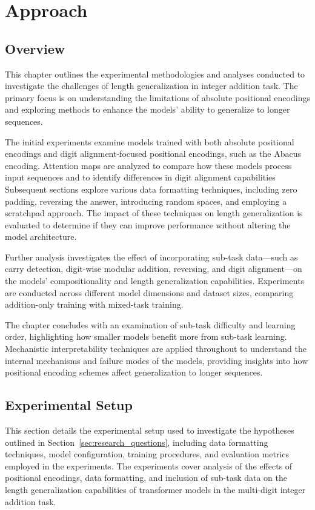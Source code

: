 \chapter{Approach}\label{approach}

\section{Overview}\label{sec:overview}

This chapter outlines the experimental methodologies and analyses conducted to investigate the challenges of length generalization in integer addition task. The primary focus is on understanding the limitations of absolute positional encodings and exploring methods to enhance the models' ability to generalize to longer sequences.

The initial experiments examine models trained with both absolute positional encodings and digit alignment-focused positional encodings, such as the Abacus encoding. Attention maps are analyzed to compare how these models process input sequences and to identify differences in digit alignment capabilities Subsequent sections explore various data formatting techniques, including zero padding, reversing the answer, introducing random spaces, and employing a scratchpad approach. The impact of these techniques on length generalization is evaluated to determine if they can improve performance without altering the model architecture.

Further analysis investigates the effect of incorporating sub-task data—such as carry detection, digit-wise modular addition, reversing, and digit alignment—on the models' compositionality and length generalization capabilities. Experiments are conducted across different model dimensions and dataset sizes, comparing addition-only training with mixed-task training.

The chapter concludes with an examination of sub-task difficulty and learning order, highlighting how smaller models benefit more from sub-task learning. Mechanistic interpretability techniques are applied throughout to understand the internal mechanisms and failure modes of the models, providing insights into how positional encoding schemes affect generalization to longer sequences.


\section{Experimental Setup}\label{sec:experimental_setup}
This section details the experimental setup used to investigate the hypotheses outlined in Section~\ref{sec:research_questions}, including data formatting techniques, model configuration, training procedures, and evaluation metrics employed in the experiments. The experiments cover analysis of the effects of positional encodings, data formatting, and inclusion of sub-task data on the length generalization capabilities of transformer models in the multi-digit integer addition task.

